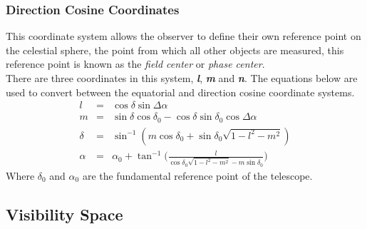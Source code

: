 \subsubsection{Direction Cosine Coordinates}
This coordinate system allows the observer to define their own reference point on the celestial sphere, the point from which all other objects are measured, this reference point is known as the \textit{field center} or \textit{phase center}. \\
There are three coordinates in this system, \textit{\textbf{l}}, \textit{\textbf{m} }and\textit{ \textbf{n}}. The equations below are used to convert between the equatorial and direction cosine coordinate systems. 
\begin{eqnarray}
l &=&  \cos \delta  \sin \Delta \alpha \nonumber\\
m &=& \sin \delta \cos \delta_0 - \cos \delta \sin \delta_0 \cos\Delta \alpha \nonumber\\
\delta &=& \sin^{-1}(m\cos \delta_0 + \sin \delta_0\sqrt{1-l^2-m^2})\nonumber\\
\alpha &=& \alpha_0 + \tan^{-1}\bigg(\frac{l}{\cos\delta_0\sqrt{1-l^2-m^2}-m\sin\delta_0}\bigg)\nonumber
\end{eqnarray}
Where $\delta_0$ and $\alpha_0$ are the fundamental reference point of the telescope.
\subsection{Visibility Space}
